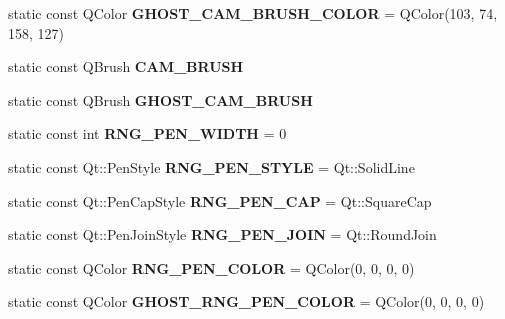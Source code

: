 \begin{DoxyCompactItemize}
\item 
\hypertarget{classCameraGUI_a0fffcb81bdb6e757d8b22eb0fc300d63}{static const Q\-Color {\bfseries G\-H\-O\-S\-T\-\_\-\-C\-A\-M\-\_\-\-B\-R\-U\-S\-H\-\_\-\-C\-O\-L\-O\-R} = Q\-Color(103, 74, 158, 127)}\label{classCameraGUI_a0fffcb81bdb6e757d8b22eb0fc300d63}

\item 
\hypertarget{classCameraGUI_a098d01461f680aff5b47d09235e6748a}{static const Q\-Brush {\bfseries C\-A\-M\-\_\-\-B\-R\-U\-S\-H}}\label{classCameraGUI_a098d01461f680aff5b47d09235e6748a}

\item 
\hypertarget{classCameraGUI_ae939ce3f55739a8b8d9cf9b6740da91d}{static const Q\-Brush {\bfseries G\-H\-O\-S\-T\-\_\-\-C\-A\-M\-\_\-\-B\-R\-U\-S\-H}}\label{classCameraGUI_ae939ce3f55739a8b8d9cf9b6740da91d}

\item 
\hypertarget{classCameraGUI_af5a35c36f4043bd723778f4488009b35}{static const int {\bfseries R\-N\-G\-\_\-\-P\-E\-N\-\_\-\-W\-I\-D\-T\-H} = 0}\label{classCameraGUI_af5a35c36f4043bd723778f4488009b35}

\item 
\hypertarget{classCameraGUI_af9e000abeddf2a871e2d5ef4d08773bf}{static const Qt\-::\-Pen\-Style {\bfseries R\-N\-G\-\_\-\-P\-E\-N\-\_\-\-S\-T\-Y\-L\-E} = Qt\-::\-Solid\-Line}\label{classCameraGUI_af9e000abeddf2a871e2d5ef4d08773bf}

\item 
\hypertarget{classCameraGUI_a042cca0636bb39244a0a689af8f62b17}{static const Qt\-::\-Pen\-Cap\-Style {\bfseries R\-N\-G\-\_\-\-P\-E\-N\-\_\-\-C\-A\-P} = Qt\-::\-Square\-Cap}\label{classCameraGUI_a042cca0636bb39244a0a689af8f62b17}

\item 
\hypertarget{classCameraGUI_a6d4f35cefc63050d44b5a1271059653c}{static const Qt\-::\-Pen\-Join\-Style {\bfseries R\-N\-G\-\_\-\-P\-E\-N\-\_\-\-J\-O\-I\-N} = Qt\-::\-Round\-Join}\label{classCameraGUI_a6d4f35cefc63050d44b5a1271059653c}

\item 
\hypertarget{classCameraGUI_aec90c5accd29fffeb8735551d6f66f23}{static const Q\-Color {\bfseries R\-N\-G\-\_\-\-P\-E\-N\-\_\-\-C\-O\-L\-O\-R} = Q\-Color(0, 0, 0, 0)}\label{classCameraGUI_aec90c5accd29fffeb8735551d6f66f23}

\item 
\hypertarget{classCameraGUI_a4d24939af4bb409df6b89b0cb974074c}{static const Q\-Color {\bfseries G\-H\-O\-S\-T\-\_\-\-R\-N\-G\-\_\-\-P\-E\-N\-\_\-\-C\-O\-L\-O\-R} = Q\-Color(0, 0, 0, 0)}\label{classCameraGUI_a4d24939af4bb409df6b89b0cb974074c}


\end{DoxyCompactItemize}
